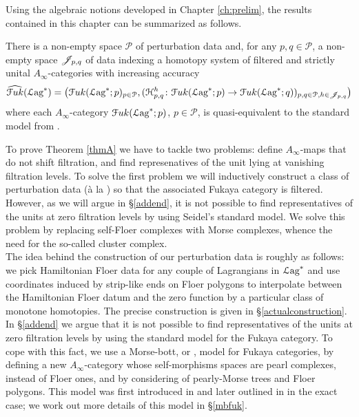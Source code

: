 Using the algebraic notions developed in Chapter \ref{ch:prelim}, the results contained in this chapter can be summarized as follows.

\begin{thm}\label{thmA} There is a non-empty space $\mathcal{P}$ of perturbation data and, for any $p,q\in \mathcal{P}$, a non-empty space ${\mathscr{J}}_{p,q}$ of  data indexing a homotopy system of filtered and strictly unital $A_\infty$-categories with increasing accuracy $$\widehat{\mathcal{F}uk}({\mathcal{L}\text{ag}}^*) = \left( \mathcal{F}uk({\mathcal{L}\text{ag}}^*;p)_{p\in \mathcal{P}}, (\mathcal{H}_{p,q}^h\colon \mathcal{F}uk({\mathcal{L}\text{ag}}^*;p)\to \mathcal{F}uk({\mathcal{L}\text{ag}}^*;q))_{p,q\in \mathcal{P}, h\in {\mathscr{J}}_{p,q}}\right)$$
where each $A_\infty$-category $ \mathcal{F}uk({\mathcal{L}\text{ag}}^*;p)$, $p\in \mathcal{P}$, is quasi-equivalent to the standard model from \cite{Se:book-fukaya-categ}.
\end{thm}

To prove Theorem \ref{thmA} we have to tackle two problems: define $A_\infty$-maps that do not shift filtration, and find represenatives of the unit lying at vanishing filtration levels. To solve the first problem we will inductively construct a class of perturbation data (à la \cite{Se:book-fukaya-categ}) so that the associated Fukaya category is filtered.
However, as we will argue in \S \ref{addend}, it is not possible to find representatives of the units at zero filtration levels by using Seidel's standard model. We solve this problem by replacing self-Floer complexes with Morse complexes, whence the need for the so-called cluster complex.\\
The idea behind the construction of our perturbation data is roughly as follows: we pick  Hamiltonian Floer data for any couple of Lagrangians in ${\mathcal{L}\text{ag}}^*$ and use coordinates induced by strip-like ends on Floer polygons to interpolate between the Hamiltonian Floer datum and the zero function by a particular class of monotone homotopies. The precise construction is given in \S \ref{actualconstruction}. In \S \ref{addend} we argue that it is not possible to find representatives of the units at zero filtration levels by using the standard model for the Fukaya category. To cope with this fact, we use a Morse-bott, or , model for Fukaya categories, by defining a new $A_\infty$-category whose self-morphisms spaces are pearl complexes, instead of Floer ones, and by considering  of pearly-Morse trees and Floer polygons. This model was first introduced in \cite{Cor-La:Cluster-2} and later outlined in \cite{BCZ:tpc} in the exact case; we work out more details of this model in \S \ref{mbfuk}.\\

